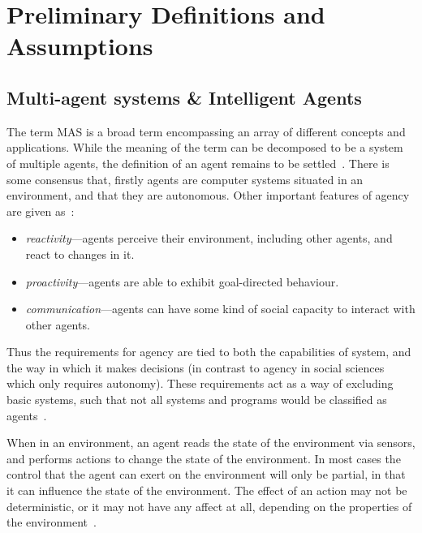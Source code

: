 
\section{Preliminary Definitions and Assumptions}

\subsection{Multi-agent systems \& Intelligent Agents}\label{sec:agents}

The term \ac{MAS} is a broad term encompassing an array of different concepts and applications. While the meaning of the term can be decomposed to be a system of multiple agents, the definition of an agent remains to be settled~\citep{Wooldridge2002}. There is some consensus that, firstly agents are computer systems situated in an environment, and that they are autonomous. Other important features of agency are given as~\citep{Wooldridge1995,HayesRoth1995}:
\begin{itemize}
\item \emph{reactivity}---agents perceive their environment, including other agents, and react to changes in it.
\item \emph{proactivity}---agents are able to exhibit goal-directed behaviour.
\item \emph{communication}---agents can have some kind of social capacity to interact with other agents.
\end{itemize}

Thus the requirements for agency are tied to both the capabilities of system, and the way in which it makes decisions (in contrast to agency in social sciences which only requires autonomy). These requirements act as a way of excluding basic systems, such that not all systems and programs would be classified as agents~\citep{Franklin1997}.

When in an environment, an agent reads the state of the environment via sensors, and performs actions to change the state of the environment. In most cases the control that the agent can exert on the environment will only be partial, in that it can influence the state of the environment. The effect of an action may not be deterministic, or it may not have any affect at all, depending on the properties of the environment~\citep{Wooldridge2002}.

